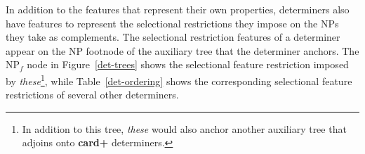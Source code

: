 \addtocounter{footnote}{-3} 
 
 
In addition to the features that represent their own properties, determiners 
also have features to represent the selectional 
restrictions they impose on the NPs they take as complements.  The 
selectional restriction features of a determiner appear on the NP footnode of 
the auxiliary tree that the determiner anchors.  The NP$_{f}$ node in Figure~\ref{det-trees} shows the selectional feature 
restriction imposed by {\it these}\footnote{In addition to this tree, {\it these} would also anchor another auxiliary tree that adjoins onto {\bf card+} determiners.}, while Table~\ref{det-ordering} shows the corresponding 
selectional feature restrictions of several other determiners. 
\small 
